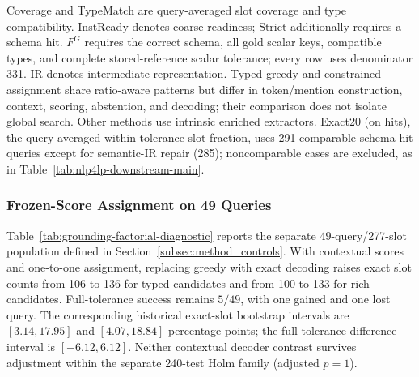 \documentclass[pdflatex,iicol,sn-basic,Numbered]{sn-jnl}
\begin{document}
\begin{table}[t]
  \vspace{2mm}
  \begin{minipage}{\textwidth}
  \small\raggedright
  Coverage and TypeMatch are query-averaged slot coverage and type compatibility. InstReady denotes coarse readiness; Strict additionally requires a schema hit. $F^G$ requires the correct schema, all gold scalar keys, compatible types, and complete stored-reference scalar tolerance; every row uses denominator 331. IR denotes intermediate representation. Typed greedy and constrained assignment share ratio-aware patterns but differ in token/mention construction, context, scoring, abstention, and decoding; their comparison does not isolate global search. Other methods use intrinsic enriched extractors. Exact20 (on hits), the query-averaged within-tolerance slot fraction, uses 291 comparable schema-hit queries except for semantic-IR repair (285); noncomparable cases are excluded, as in Table~\ref{tab:nlp4lp-downstream-main}.
  \end{minipage}
\end{table}

\subsubsection{Frozen-Score Assignment on 49 Queries}
\label{subsec:grounding-followup}
Table~\ref{tab:grounding-factorial-diagnostic} reports the separate 49-query/277-slot population defined in Section~\ref{subsec:method_controls}. With contextual scores and one-to-one assignment, replacing greedy with exact decoding raises exact slot counts from 106 to 136 for typed candidates and from 100 to 133 for rich candidates. Full-tolerance success remains $5/49$, with one gained and one lost query. The corresponding historical exact-slot bootstrap intervals are $[3.14,17.95]$ and $[4.07,18.84]$ percentage points; the full-tolerance difference interval is $[-6.12,6.12]$. Neither contextual decoder contrast survives adjustment within the separate 240-test Holm family (adjusted $p=1$).
\end{document}
